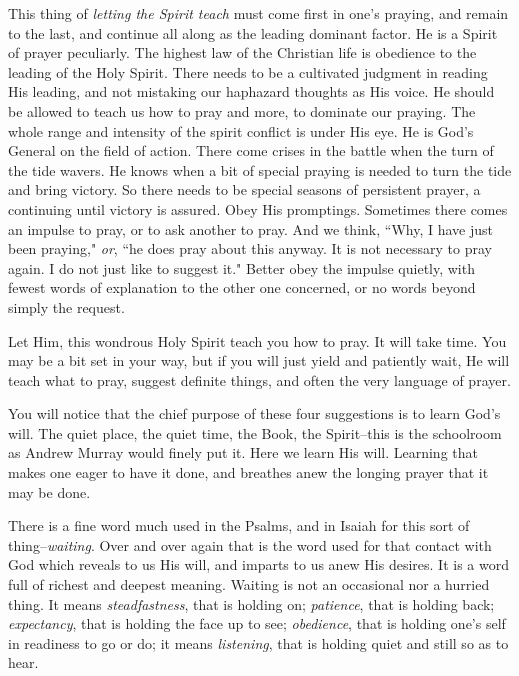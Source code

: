 This thing of \textit{letting the Spirit teach} must come first in one's praying,
and remain to the last, and continue all along as the leading dominant
factor. He is a Spirit of prayer peculiarly. The highest law of the
Christian life is obedience to the leading of the Holy Spirit. There needs
to be a cultivated judgment in reading His leading, and not mistaking our
haphazard thoughts as His voice. He should be allowed to teach us how to
pray and more, to dominate our praying. The whole range and intensity of
the spirit conflict is under His eye. He is God's General on the field of
action. There come crises in the battle when the turn of the tide wavers.
He knows when a bit of special praying is needed to turn the tide and
bring victory. So there needs to be special seasons of persistent prayer,
a continuing until victory is assured. Obey His promptings. Sometimes
there comes an impulse to pray, or to ask another to pray. And we think,
``Why, I have just been praying," \textit{or}, ``he does pray about this anyway. It
is not necessary to pray again. I do not just like to suggest it." Better
obey the impulse quietly, with fewest words of explanation to the other
one concerned, or no words beyond simply the request.

Let Him, this wondrous Holy Spirit teach you how to pray. It will take
time. You may be a bit set in your way, but if you will just yield and
patiently wait, He will teach what to pray, suggest definite things, and
often the very language of prayer.

You will notice that the chief purpose of these four suggestions is to
learn God's will. The quiet place, the quiet time, the Book, the
Spirit--this is the schoolroom as Andrew Murray would finely put it. Here
we learn His will. Learning that makes one eager to have it done, and
breathes anew the longing prayer that it may be done.

There is a fine word much used in the Psalms, and in Isaiah for this sort
of thing--\textit{waiting}. Over and over again that is the word used for that
contact with God which reveals to us His will, and imparts to us anew His
desires. It is a word full of richest and deepest meaning. Waiting is not
an occasional nor a hurried thing. It means \textit{steadfastness}, that is
holding on; \textit{patience}, that is holding back; \textit{expectancy}, that is
holding the face up to see; \textit{obedience}, that is holding one's self in
readiness to go or do; it means \textit{listening}, that is holding quiet and
still so as to hear.



